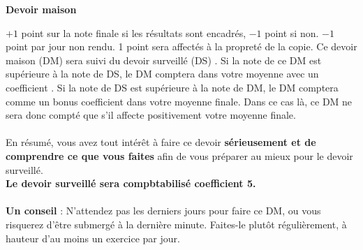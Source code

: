 \documentclass[12pt,
addpoints,
answers,
fleqn
]{exam}
\begin{document}
\begin{center}
    {\huge\bfseries Devoir maison }
    \par\bigskip
\end{center}

$+1$ point sur la note finale si les résultats sont encadrés, $-1$ point si non. $-1$ point par jour non rendu. 1 point sera affectés à la propreté de la copie.
Ce devoir maison (DM) sera suivi du devoir surveillé (DS) . Si la note de ce DM est supérieure à la note de DS, le DM comptera dans votre moyenne avec un coefficient . Si la note de DS est supérieure à la note de DM, le DM comptera comme un bonus coefficient  dans votre moyenne finale. Dans ce cas là, ce DM ne sera donc compté que s'il affecte positivement votre moyenne finale. \\ \\
En résumé, vous avez tout intérêt à faire ce devoir \textbf{sérieusement et de comprendre ce que vous faites} afin de vous préparer au mieux pour le devoir surveillé.\\
\textbf{Le devoir surveillé sera compbtabilisé coefficient 5.} \\ \\
\textbf{Un conseil} : N'attendez pas les derniers jours pour faire ce DM, ou vous risquerez d'être submergé à la dernière minute. Faites-le plutôt régulièrement, à hauteur d'au moins un exercice par jour. \\
\end{document}
